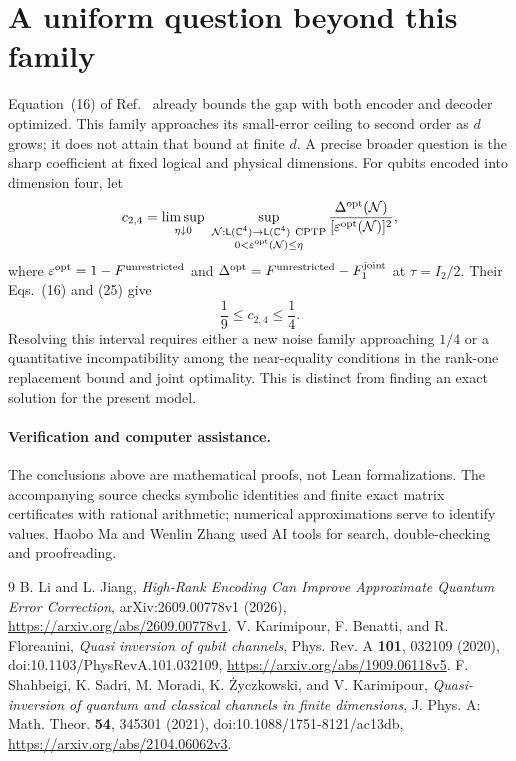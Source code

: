 \documentclass[11pt]{article}
\begin{document}
\section{A uniform question beyond this family}
Equation~(16) of Ref.~\cite{LiJiang} already bounds the gap with both encoder
and decoder optimized. This family approaches its small-error ceiling to
second order as $d$ grows; it does not attain that bound at finite $d$.
A precise broader question is the sharp coefficient at fixed logical and
physical dimensions. For qubits encoded into dimension four, let
\[
 c_{2,4}=\limsup_{\eta\downarrow0}\ \sup_{\substack{
 \mathcal N:\mathsf L(\mathbb C^4)\to\mathsf L(\mathbb C^4)\ {\rm CPTP}\\
 0<\varepsilon^{\rm opt}(\mathcal N)\le\eta}}
 \frac{\Delta^{\rm opt}(\mathcal N)}{[\varepsilon^{\rm opt}(\mathcal N)]^2},
\]
where $\varepsilon^{\rm opt}=1-F^{\rm unrestricted}$ and
$\Delta^{\rm opt}=F^{\rm unrestricted}-F_1^{\rm joint}$ at $\tau=I_2/2$.
Their Eqs.~(16) and (25) give
\[
 \frac19\le c_{2,4}\le\frac14.
\]
Resolving this interval requires either a new noise family approaching
$1/4$ or a quantitative incompatibility among the near-equality conditions
in the rank-one replacement bound and joint optimality. This is distinct
from finding an exact solution for the present model.

\paragraph{Verification and computer assistance.}
The conclusions above are mathematical proofs, not Lean formalizations.
The accompanying source checks symbolic identities and finite exact matrix
certificates with rational arithmetic; numerical approximations serve to
identify values. Haobo Ma and Wenlin Zhang used AI tools for search,
double-checking and proofreading.

\begin{thebibliography}{9}
 B. Li and L. Jiang,
\emph{High-Rank Encoding Can Improve Approximate Quantum Error Correction},
arXiv:2609.00778v1 (2026),
\url{https://arxiv.org/abs/2609.00778v1}.
 V. Karimipour, F. Benatti, and R. Floreanini,
\emph{Quasi inversion of qubit channels}, Phys. Rev. A \textbf{101},
032109 (2020), doi:10.1103/PhysRevA.101.032109,
\url{https://arxiv.org/abs/1909.06118v5}.
 F. Shahbeigi, K. Sadri, M. Moradi, K. \.Zyczkowski,
and V. Karimipour,
\emph{Quasi-inversion of quantum and classical channels in finite dimensions},
J. Phys. A: Math. Theor. \textbf{54}, 345301 (2021),
doi:10.1088/1751-8121/ac13db,
\url{https://arxiv.org/abs/2104.06062v3}.
\end{thebibliography}
\end{document}
